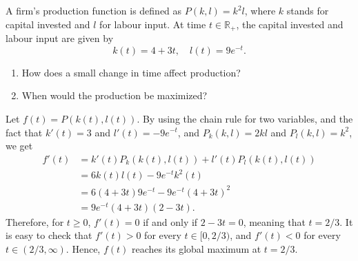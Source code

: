 \documentclass[11.0pt]{exam}
\newcommand{\R}{\mathbb{R}} %
\begin{document}
\begin{questions}
\question[3]
    A firm's production function is defined as $P(k, l) = k^2l$, where $k$ stands for capital invested and $l$ for labour input. At time $t\in\R_+$, the capital invested and labour input are given by
    $$
    k(t) = 4 + 3t, \quad l(t) = 9e^{-t}.
    $$

    \begin{enumerate}[leftmargin = 0.5cm, label = (\alph*), rightmargin = 0.2cm]
        
        \item How does a small change in time affect production?

        \item When would the production be maximized?

        

        
    \end{enumerate}

\begin{solution}[0cm]
    Let $f(t) = P(k(t), l(t))$. By using the chain rule for two variables, and the fact that $k'(t) = 3$ and $l'(t) = -9e^{-t}$, and $P_k(k, l) = 2kl$ and $P_l(k, l) = k^2$, we get
    \begin{align*}
        f'(t) &= k'(t)P_k(k(t), l(t)) + l'(t)P_l(k(t), l(t)) \\
        &= 6k(t)l(t) - 9e^{-t}k^2(t) \\
        &= 6(4 + 3t)9e^{-t} - 9e^{-t}(4 + 3t)^2 \\
        &= 9e^{-t}(4 + 3t)(2 - 3t).
    \end{align*}
    Therefore, for $t \geq 0$, $f'(t) = 0$ if and only if $2 - 3t = 0$, meaning that $t = 2/3$. It is easy to check that $f'(t) > 0$ for every $t\in[0, 2/3)$, and $f'(t) < 0$ for every $t \in (2/3, \infty)$. Hence, $f(t)$ reaches its global maximum at $t = 2/3$.
\end{solution}

\end{questions}	
\end{document}
